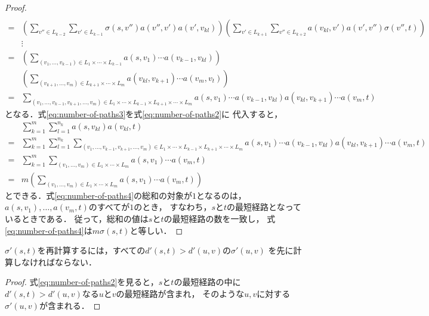 \begin{proof}
\begin{align}
    \nonumber\\
    =&\left(\sum_{v''\in L_{k-2}}\sum_{v'\in L_{k-1}}
    \sigma(s,v'')a(v'',v')a(v',v_{kl})\right)
    \left(\sum_{v'\in L_{k+1}}\sum_{v''\in L_{k+2}}
    a(v_{kl},v')a(v',v'')\sigma(v'',t)\right)
    \nonumber\\
    &\vdots\nonumber\\
    =&\left(\sum_{(v_1,\ldots,v_{k-1})\in L_1\times\cdots\times L_{k-1}}
    a(s,v_1)\cdots a(v_{k-1},v_{kl})\right)\nonumber\\
    &\left(\sum_{(v_{k+1},\ldots,v_m)\in L_{k+1}\times\cdots\times L_m}
    a(v_{kl},v_{k+1})\cdots a(v_m,v_t)\right)\nonumber\\
    =&\sum_{
      (v_1,\ldots,v_{k-1},v_{k+1},\ldots,v_m)\in
      L_1\times\cdots\times L_{k-1}\times L_{k+1}\times\cdots\times L_m
    }
    a(s,v_1)\cdots a(v_{k-1},v_{kl})a(v_{kl},v_{k+1})\cdots a(v_m,t)
    \label{eq:number-of-paths3}
  \end{align}
  となる．式\ref{eq:number-of-paths3}を式\ref{eq:number-of-paths2}に
  代入すると，
  \begin{align}
    &\sum_{k=1}^m\sum_{l=1}^{n_k}a(s,v_{kl})a(v_{kl},t)\nonumber\\
    =&\sum_{k=1}^m\sum_{l=1}^{n_k}\sum_{
      (v_1,\ldots,v_{k-1},v_{k+1},\ldots,v_m)\in
      L_1\times\cdots\times L_{k-1}\times L_{k+1}\times\cdots\times L_m
    }
    a(s,v_1)\cdots a(v_{k-1},v_{kl})a(v_{kl},v_{k+1})\cdots a(v_m,t)\nonumber\\
    =&\sum_{k=1}^m\sum_{(v_1,\ldots,v_m)\in L_1\times\cdots\times L_m}
    a(s,v_1)\cdots a(v_m,t)\nonumber\\
    =&m\left(\sum_{(v_1,\ldots,v_m)\in L_1\times\cdots\times L_m}
    a(s,v_1)\cdots a(v_m,t)\right)
    \label{eq:number-of-paths4}
  \end{align}
  とできる．式\ref{eq:number-of-paths4}の総和の対象が$1$となるのは，
  $a(s,v_1),\ldots,a(v_m,t)$のすべてが$1$のとき，
  すなわち，$s$と$t$の最短経路となっているときである．
  従って，総和の値は$s$と$t$の最短経路の数を一致し，
  式\ref{eq:number-of-paths4}は$m\sigma(s,t)$と等しい．
\end{proof}

\begin{collary}
  $\sigma'(s,t)$を再計算するには，すべての$d'(s,t)>d'(u,v)$の$\sigma'(u,v)$
  を先に計算しなければならない．
\end{collary}
\begin{proof}
  式\ref{eq:number-of-paths2}を見ると，$s$と$t$の最短経路の中に
  $d'(s,t)>d'(u,v)$なる$u$と$v$の最短経路が含まれ，
  そのような$u,v$に対する$\sigma'(u,v)$が含まれる．
\end{proof}


